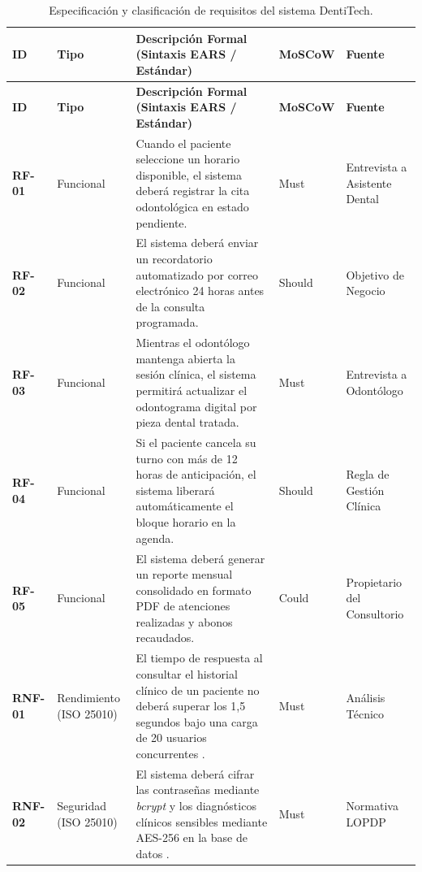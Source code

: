 \documentclass[11pt,a4paper]{article}
\begin{document}
\begingroup
\small
\setlength{\tabcolsep}{4pt}
\begin{xltabular}{\textwidth}{|p{0.10\textwidth}|p{0.15\textwidth}|X|p{0.11\textwidth}|p{0.18\textwidth}|}
\caption{Especificación y clasificación de requisitos del sistema DentiTech.} \label{tab:requisitos} \\
\hline
{}
\textbf{ID} & \textbf{Tipo} & \textbf{Descripción Formal (Sintaxis EARS / Estándar)} & \textbf{MoSCoW} & \textbf{Fuente} \\ \hline
\endfirsthead
\hline
{}
\textbf{ID} & \textbf{Tipo} & \textbf{Descripción Formal (Sintaxis EARS / Estándar)} & \textbf{MoSCoW} & \textbf{Fuente} \\ \hline
\endhead

\textbf{RF-01} & Funcional & Cuando el paciente seleccione un horario disponible, el sistema deberá registrar la cita odontológica en estado pendiente. & Must & Entrevista a Asistente Dental \\ \hline

\textbf{RF-02} & Funcional & El sistema deberá enviar un recordatorio automatizado por correo electrónico 24 horas antes de la consulta programada. & Should & Objetivo de Negocio \\ \hline

\textbf{RF-03} & Funcional & Mientras el odontólogo mantenga abierta la sesión clínica, el sistema permitirá actualizar el odontograma digital por pieza dental tratada. & Must & Entrevista a Odontólogo \\ \hline

\textbf{RF-04} & Funcional & Si el paciente cancela su turno con más de 12 horas de anticipación, el sistema liberará automáticamente el bloque horario en la agenda. & Should & Regla de Gestión Clínica \\ \hline

\textbf{RF-05} & Funcional & El sistema deberá generar un reporte mensual consolidado en formato PDF de atenciones realizadas y abonos recaudados. & Could & Propietario del Consultorio \\ \hline

\textbf{RNF-01} & Rendimiento \newline (ISO 25010) & El tiempo de respuesta al consultar el historial clínico de un paciente no deberá superar los 1,5 segundos bajo una carga de 20 usuarios concurrentes \cite{iso25010}. & Must & Análisis Técnico \\ \hline

\textbf{RNF-02} & Seguridad \newline (ISO 25010) & El sistema deberá cifrar las contraseñas mediante \textit{bcrypt} y los diagnósticos clínicos sensibles mediante AES-256 en la base de datos \cite{iso25010}. & Must & Normativa LOPDP \\ \hline


\end{xltabular}
\end{document}

